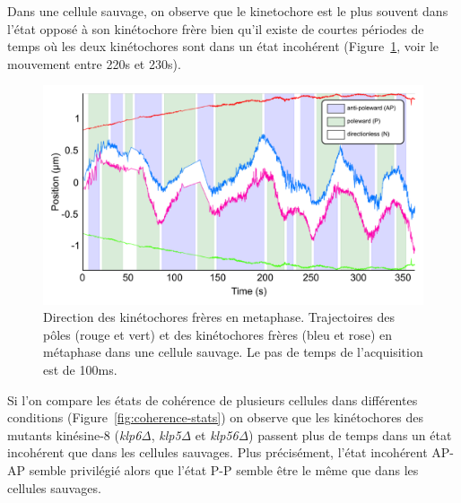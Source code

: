 \documentclass[12pt,a4paper,twoside,openright]{book}
\begin{document}
Dans une cellule sauvage, on observe que le kinetochore est le plus
souvent dans l'état opposé à son kinétochore frère bien qu'il existe de
courtes périodes de temps où les deux kinétochores sont dans un état
incohérent (Figure~\ref{fig:coherence_kymo}, voir le mouvement entre
220s et 230s).

\begin{figure}[htbp]
\centering
\includegraphics{figures/results/imaging/coherence_kymo.png}
\caption{\label{fig:coherence_kymo}Direction des kinétochores frères en
metaphase. Trajectoires des pôles (rouge et vert) et des kinétochores
frères (bleu et rose) en métaphase dans une cellule sauvage. Le pas de
temps de l'acquisition est de 100ms.}
\end{figure}

Si l'on compare les états de cohérence de plusieurs cellules dans
différentes conditions (Figure~\ref{fig:coherence-stats}) on observe que
les kinétochores des mutants kinésine-8 (\emph{klp6Δ}, \emph{klp5Δ} et
\emph{klp56Δ}) passent plus de temps dans un état incohérent que dans
les cellules sauvages. Plus précisément, l'état incohérent AP-AP semble
privilégié alors que l'état P-P semble être le même que dans les
cellules sauvages.
\end{document}
